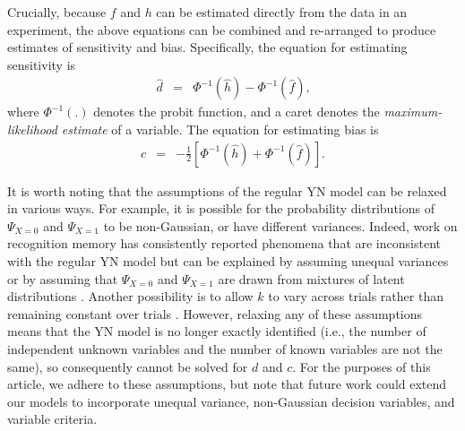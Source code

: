 \documentclass[man]{apa6}
\begin{document}
Crucially, because $f$ and $h$ can be estimated directly from the data in an experiment, the above equations can be combined and re-arranged to produce estimates of sensitivity and bias. Specifically, the equation for estimating sensitivity is
\begin{eqnarray}
\hat{d}&=&\Phi^{-1}\left(\hat{h}\right)-\Phi^{-1}\left(\hat{f}\right)\textrm{,}
\label{eq1}
\end{eqnarray}where $\Phi^{-1}\left(.\right)$ denotes the probit function, and a caret denotes the \emph{maximum-likelihood estimate} of a variable. The equation for estimating bias is
\begin{eqnarray}
\hat{c}&=&-\frac{1}{2}\left[\Phi^{-1}\left(\hat{h}\right)+\Phi^{-1}\left(\hat{f}\right)\right]\textrm{.}
\label{eq2}
\end{eqnarray}

It is worth noting that the assumptions of the regular YN model can be relaxed in various ways. For example, it is possible for the probability distributions of $\Psi_{X=0}$ and $\Psi_{X=1}$ to be non-Gaussian, or have different variances. Indeed, work on recognition memory has consistently reported phenomena that are inconsistent with the regular YN model but can be explained by assuming unequal variances \parencite{Wixted2007, Yonelinas2007} or by assuming that $\Psi_{X=0}$ and $\Psi_{X=1}$ are drawn from mixtures of latent distributions \parencite{decarlosignal2002}. Another possibility is to allow $k$ to vary across trials rather than remaining constant over trials \parencite{cabreraseparating2015}. However, relaxing any of these assumptions means that the YN model is no longer exactly identified (i.e., the number of independent unknown variables and the number of known variables are not the same), so consequently cannot be solved for $d$ and $c$. For the purposes of this article, we adhere to these assumptions, but note that future work could extend our models to incorporate unequal variance, non-Gaussian decision variables, and variable criteria.
\end{document}
